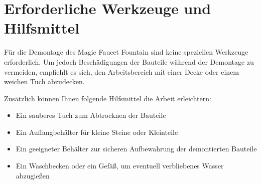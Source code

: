 %
%

\chapter{Erforderliche Werkzeuge und Hilfsmittel}
Für die Demontage des Magic Faucet Fountain sind keine speziellen Werkzeuge erforderlich. Um jedoch Beschädigungen der Bauteile während der Demontage zu vermeiden, empfiehlt es sich, den Arbeitsbereich mit einer Decke oder einem weichen Tuch abzudecken.

Zusätzlich können Ihnen folgende Hilfsmittel die Arbeit erleichtern:
\begin{itemize}
	\item Ein sauberes Tuch zum Abtrocknen der Bauteile
	\item Ein Auffangbehälter für kleine Steine oder Kleinteile
	\item Ein geeigneter Behälter zur sicheren Aufbewahrung der demontierten Bauteile
	\item Ein Waschbecken oder ein Gefäß, um eventuell verbliebenes Wasser abzugießen
\end{itemize}

